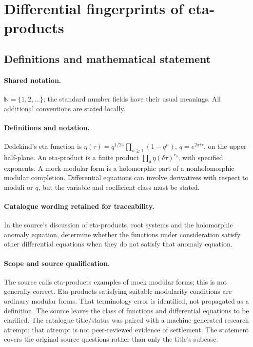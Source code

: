 \documentclass[11pt]{article}
\begin{document}
\section{Differential fingerprints of eta-products}\label{statement}

\subsection{Definitions and mathematical statement}

\paragraph{Shared notation.}$\mathbb N=\{1,2,\ldots\}$; the standard number fields have their usual meanings. All additional conventions are stated locally.


\paragraph{Definitions and notation.}Dedekind’s eta function is $\eta(\tau)=q^{1/24}\prod_{n\ge1}(1-q^n)$, $q=e^{2\pi i\tau}$, on the upper half-plane. An eta-product is a finite product $\prod_\delta\eta(\delta\tau)^{r_\delta}$, with specified exponents. A mock modular form is a holomorphic part of a nonholomorphic modular completion. Differential equations can involve derivatives with respect to moduli or $q$, but the variable and coefficient class must be stated.

\paragraph{Catalogue wording retained for traceability.}
In the source’s discussion of eta-products, root systems and the holomorphic anomaly equation, determine whether the functions under consideration satisfy other differential equations when they do not satisfy that anomaly equation.
\paragraph{Scope and source qualification.}The source calls eta-products examples of mock modular forms; this is not generally correct. Eta-products satisfying suitable modularity conditions are ordinary modular forms. That terminology error is identified, not propagated as a definition. The source leaves the class of functions and differential equations to be clarified. The catalogue title/status was paired with a machine-generated research attempt; that attempt is not peer-reviewed evidence of settlement. The statement covers the original source questions rather than only the title’s subcase.
\end{document}

